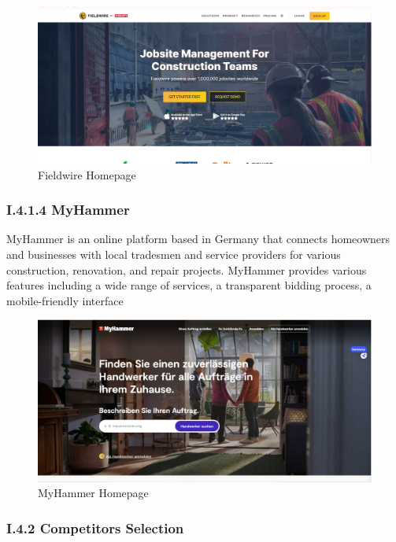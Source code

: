 \begin{figure}[H]
    \centering
    \includegraphics[width=1\textwidth]{src/assets/chapters/fieldwire.PNG}
    \caption{Fieldwire Homepage}
    \label{fig:fieldwire_image}
\end{figure}
 
\subsubsection*{I.4.1.4 MyHammer}

MyHammer is an online platform based in Germany that connects homeowners and businesses with local tradesmen and service providers for various construction, renovation, and repair projects.
MyHammer provides various features including a wide range of services, a transparent bidding process, a mobile-friendly interface


\begin{figure}[H]
    \centering
    \includegraphics[width=1\textwidth]{src/assets/chapters/myHammer.PNG}
    \caption{MyHammer Homepage}
    \label{fig:myhammer_image}
\end{figure}
 

\subsubsection*{I.4.2 Competitors Selection}

